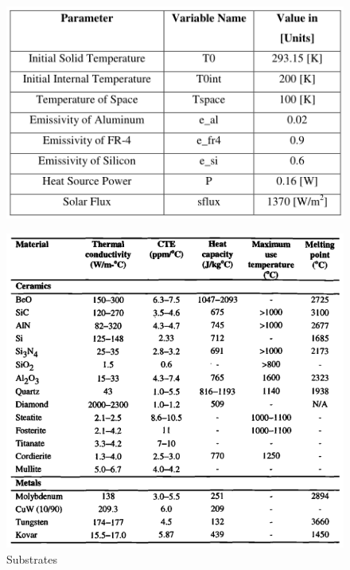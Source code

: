 \documentclass[final]{cubedoc}
\begin{document}
	\begin{figure}[h!]
		\centering
		\includegraphics[keepaspectratio, width=\textwidth]{docs/emissivity_silicon_fr4.png}
		\caption{\cite[p.41]{peake2014cubesat}}
		\label{fig:my_label}
	\end{figure}
	
	
	\begin{figure}[h!]
		\centering
		\includegraphics[keepaspectratio, width=\textwidth]{docs/substrates.png}
		\caption{Substrates \cite[p.32]{pecht1998electronic}}
		\label{fig:my_label}
	\end{figure}
	
\end{document}
